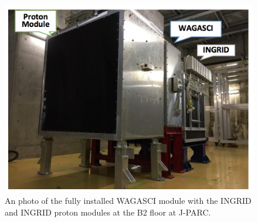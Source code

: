\begin{figure}
\centering
\includegraphics[width=\textwidth]{figures/NeutrinoChap/NuFactTalk/WAGASCIlayout2.jpeg}
    \caption{An photo of the fully installed WAGASCI module with the INGRID and INGRID proton modules at the B2 floor at J-PARC.}
    \label{fig:installed}
\end{figure}





